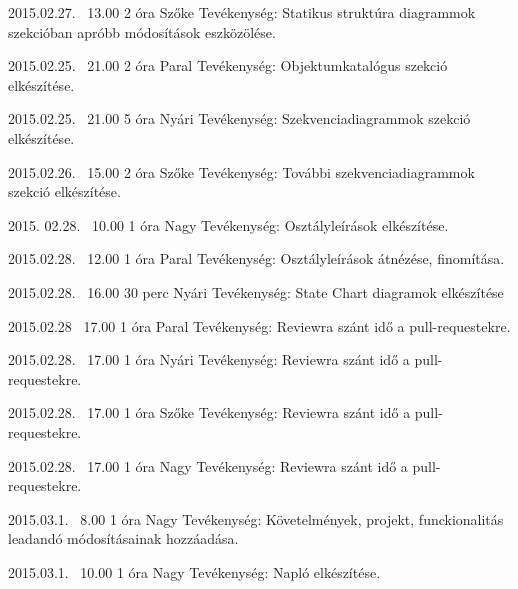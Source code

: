 \begin{naplo}
	\bejegyzes
	{2015.02.27. ~13.00}
	{2 óra}
	{Szőke} 
	{Tevékenység: Statikus struktúra diagrammok szekcióban apróbb módosítások eszközölése.\newline } 
	
	\bejegyzes
	{2015.02.25. ~21.00}
	{2 óra}
	{Paral} 
	{Tevékenység: Objektumkatalógus szekció elkészítése.\newline } 
	
	\bejegyzes
	{2015.02.25. ~21.00}
	{5 óra}
	{Nyári} 
	{Tevékenység: Szekvenciadiagrammok szekció elkészítése.\newline } 
	
	\bejegyzes
	{2015.02.26. ~15.00}
	{2 óra}
	{Szőke} 
	{Tevékenység: További szekvenciadiagrammok szekció elkészítése.\newline } 
	
	\bejegyzes
	{2015. 02.28. ~10.00}
	{1 óra}
	{Nagy}
	{Tevékenység: Osztályleírások elkészítése.\newline }
	
	\bejegyzes
	{2015.02.28. ~12.00}
	{1 óra}
	{Paral}
	{Tevékenység: Osztályleírások átnézése, finomítása.\newline}
	
	\bejegyzes
	{2015.02.28. ~16.00}
	{30 perc}
	{Nyári}
	{Tevékenység:  State Chart diagramok elkészítése}
	
	\bejegyzes
	{2015.02.28 ~17.00}
	{1 óra}
	{Paral} 
	{Tevékenység: Reviewra szánt idő a pull-requestekre.\newline } 
	
	\bejegyzes
	{2015.02.28. ~17.00}
	{1 óra}
	{Nyári} 
	{Tevékenység: Reviewra szánt idő a pull-requestekre.\newline } 
	
	\bejegyzes
	{2015.02.28. ~17.00}
	{1 óra}
	{Szőke} 
	{Tevékenység: Reviewra szánt idő a pull-requestekre.\newline } 
	
	\bejegyzes
	{2015.02.28. ~17.00}
	{1 óra}
	{Nagy} 
	{Tevékenység: Reviewra szánt idő a pull-requestekre.\newline } 
	
	\bejegyzes
	{2015.03.1. ~8.00}
	{1 óra}
	{Nagy} 
	{Tevékenység: Követelmények, projekt, funckionalitás leadandó módosításainak hozzáadása.\newline } 
	
	\bejegyzes
	{2015.03.1. ~10.00}
	{1 óra}
	{Nagy} 
	{Tevékenység: Napló elkészítése.\newline } 
	
\end{naplo}



